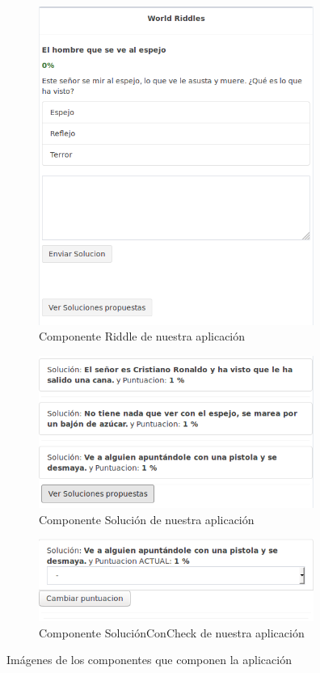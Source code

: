 \begin{figure}[hbtp] \centering \ContinuedFloat
\begin{subfigure}{.6\textwidth}
     \centerline{\includegraphics[width=9cm]{figuras/riddle.png}}
    \caption{Componente Riddle de nuestra aplicación} 
    \label{fig::riddle}
\end{subfigure}
\par\bigskip 
\begin{subfigure}{.6\textwidth}
     \centerline{\includegraphics[width=9cm]{figuras/solucion.png}}
    \caption{Componente Solución de nuestra aplicación} 
    \label{fig::solucionComponent}
\end{subfigure}
\par\bigskip 
\begin{subfigure}{.6\textwidth}
     \centerline{\includegraphics[width=9cm]{figuras/solucionconcheck.png}}
    \caption{Componente SoluciónConCheck de nuestra aplicación} 
    \label{fig::solucionconcheck}
\end{subfigure}
\caption{Imágenes de los componentes que componen la aplicación}
\label{fig::componentes}
\end{figure}


